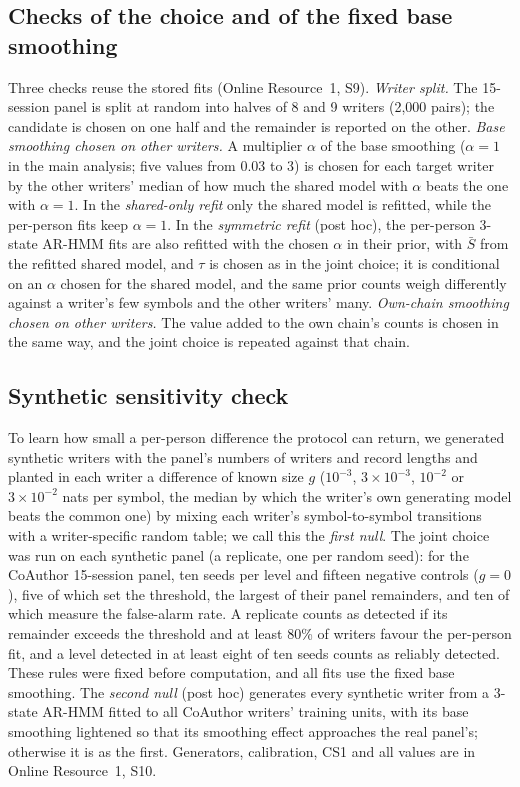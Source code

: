 \documentclass[pdflatex,sn-basic]{sn-jnl}
\newcommand{\Sref}[1]{Online Resource~1, S#1}
\newcommand{\arthree}{\mbox{3-state} \mbox{AR-HMM}}
\begin{document}
\subsection{Checks of the choice and of the fixed base smoothing}\label{sec:checks-method}
Three checks reuse the stored fits (\Sref{9}).
\emph{Writer split.} The 15-session panel is split at random into halves of 8 and 9 writers (2,000 pairs); the candidate is chosen on one half and the remainder is reported on the other.
\emph{Base smoothing chosen on other writers.} A multiplier $\alpha$ of the base smoothing ($\alpha=1$ in the main analysis; five values from 0.03 to 3) is chosen for each target writer by the other writers' median of how much the shared model with $\alpha$ beats the one with $\alpha=1$. In the \emph{shared-only refit} only the shared model is refitted, while the per-person fits keep $\alpha=1$. In the \emph{symmetric refit} (post hoc), the per-person \arthree{} fits are also refitted with the chosen $\alpha$ in their prior, with $\bar S$ from the refitted shared model, and $\tau$ is chosen as in the joint choice; it is conditional on an $\alpha$ chosen for the shared model, and the same prior counts weigh differently against a writer's few symbols and the other writers' many.
\emph{Own-chain smoothing chosen on other writers.} The value added to the own chain's counts is chosen in the same way, and the joint choice is repeated against that chain.

\subsection{Synthetic sensitivity check}\label{sec:sens-method}
To learn how small a per-person difference the protocol can return, we generated synthetic writers with the panel's numbers of writers and record lengths and planted in each writer a difference of known size $g$ ($10^{-3}$, $3\times10^{-3}$, $10^{-2}$ or $3\times10^{-2}$ nats per symbol, the median by which the writer's own generating model beats the common one) by mixing each writer's symbol-to-symbol transitions with a writer-specific random table; we call this the \emph{first null}. The joint choice was run on each synthetic panel (a replicate, one per random seed): for the CoAuthor 15-session panel, ten seeds per level and fifteen negative controls ($g=0$), five of which set the threshold, the largest of their panel remainders, and ten of which measure the false-alarm rate. A replicate counts as detected if its remainder exceeds the threshold and at least 80\% of writers favour the per-person fit, and a level detected in at least eight of ten seeds counts as reliably detected. These rules were fixed before computation, and all fits use the fixed base smoothing. The \emph{second null} (post hoc) generates every synthetic writer from a \arthree{} fitted to all CoAuthor writers' training units, with its base smoothing lightened so that its smoothing effect approaches the real panel's; otherwise it is as the first. Generators, calibration, CS1 and all values are in \Sref{10}.
\end{document}
